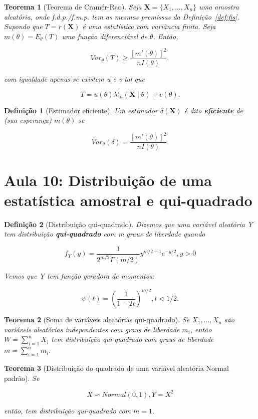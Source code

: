 \documentclass{article}
\newtheorem{theorem}{Teorema}
\newtheorem{definition}{Definição}
\begin{document}
\begin{theorem}[Teorema de Cramér-Rao]
Seja $\textbf{X} = \{ X_1, \ldots, X_n \}$ uma amostra aleatória, onde f.d.p./f.m.p. tem as mesmas premissas da Definição~\ref{def:fis}. Supondo que $T = r(\textbf{X})$ é uma estatística com variância finita. Seja $m(\theta) = E_\theta(T)$ uma função diferenciável de $\theta$. Então,

\begin{equation}
    Var_\theta(T) \geq \frac{[m'(\theta)]^2}{n I(\theta)},
\end{equation}

com igualdade apenas se existem u e v tal que

$$T = u(\theta) \lambda'_n (\textbf{X} \mid \theta) + v(\theta).$$
\end{theorem}

\begin{definition}[Estimador eficiente]
Um estimador $\delta(\textbf{X})$ é dito \textbf{eficiente} de (sua esperança) $m(\theta)$ se

$$Var_\theta(\delta) = \frac{[m'(\theta)]^2}{n I(\theta)}.$$
\end{definition}

\section*{Aula 10: Distribuição de uma estatística amostral e qui-quadrado}
\label{s10}
\begin{definition}[Distribuição qui-quadrado]
Dizemos que uma variável aleatória Y tem distribuição \textbf{qui-quadrado} com m graus de liberdade quando

\begin{equation}
    f_Y(y) = \frac{1}{2^{m/2} \Gamma(m/2)} y^{m/2 - 1} e^{-y/2}, y > 0
\end{equation}

Vemos que Y tem função geradora de momentos:

$$\psi (t) = \left ( \frac{1}{1 - 2t} \right )^{m/2}, t < 1/2.$$
\end{definition}

\begin{theorem}[Soma de variáveis aleatórias qui-quadrado]
Se $X_1, \ldots, X_n$ são variáveis aleatórias independentes com graus de liberdade $m_i$, então $W = \sum_{i = 1}^n X_i$ tem distribuição qui-quadrado com graus de liberdade $m = \sum_{i = 1}^n m_i$.
\end{theorem}

\begin{theorem}[Distribuição do quadrado de uma variável aleatória Normal padrão]
Se 

$$X \backsim Normal(0, 1), Y = X^2$$ 

então, tem distribuição qui-quadrado com $m = 1$.
\end{theorem}
\end{document}
